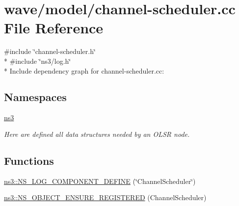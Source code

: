 \hypertarget{channel-scheduler_8cc}{}\section{wave/model/channel-\/scheduler.cc File Reference}
\label{channel-scheduler_8cc}
{\ttfamily \#include \char`\"{}channel-\/scheduler.\+h\char`\"{}}\\*
{\ttfamily \#include \char`\"{}ns3/log.\+h\char`\"{}}\\*
Include dependency graph for channel-\/scheduler.cc\+:
\subsection*{Namespaces}
\begin{DoxyCompactItemize}
\item 
 \hyperlink{namespacens3}{ns3}
\begin{DoxyCompactList}\small\item\em Here are defined all data structures needed by an O\+L\+SR node. \end{DoxyCompactList}\end{DoxyCompactItemize}
\subsection*{Functions}
\begin{DoxyCompactItemize}
\item 
\hyperlink{namespacens3_a1db8be8176444850d6ed6f69d528d2b7}{ns3\+::\+N\+S\+\_\+\+L\+O\+G\+\_\+\+C\+O\+M\+P\+O\+N\+E\+N\+T\+\_\+\+D\+E\+F\+I\+NE} (\char`\"{}Channel\+Scheduler\char`\"{})
\item 
\hyperlink{namespacens3_a4161d896ac1af63a05e52463bda86ce8}{ns3\+::\+N\+S\+\_\+\+O\+B\+J\+E\+C\+T\+\_\+\+E\+N\+S\+U\+R\+E\+\_\+\+R\+E\+G\+I\+S\+T\+E\+R\+ED} (Channel\+Scheduler)
\end{DoxyCompactItemize}
